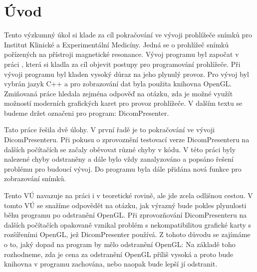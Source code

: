 \chapter{Úvod}
\vspace{-10mm}
Tento výzkumný úkol si klade za cíl pokračování ve vývoji prohlížeče snímků pro Institut Klinické a Experimentální Medicíny. Jedná se o prohlížeč snímků pořízených na přístroji magnetické resonance. Vývoj programu byl započat v práci \cite{neskudla}, která si kladla za cíl objevit postupy pro programování prohlížeče. Při vývoji programu byl kladen vysoký důraz na jeho plynulý provoz. Pro vývoj byl vybrán jazyk C++ a pro zobrazování dat byla použita knihovna OpenGL. Zmiňovaná práce hledala zejména odpověď na otázku, zda je možné využít možností moderních grafických karet pro provoz prohlížeče. V dalším textu se budeme držet označeni pro program: DicomPresenter.

Tato práce řešila dvě úlohy. V první řadě je to pokračování ve vývoji DicomPresenteru. Při pokusu o zprovoznění testovací verze DicomPresenteru na dalších počítačích se začaly oběvovat různé chyby v kódu. V této práci byly nalezené chyby odstraněny a dále bylo vždy zanalyzováno a popsáno řešení problému pro budoucí vývoj. Do programu byla dále přidána nová funkce pro zobrazování snímků.

Tento VÚ navazuje na práci \cite{neskudla} i v teoretické rovině, ale jde zcela odlišnou cestou. V tomto VÚ se snažíme odpovědět na otázku, jak výrazný bude pokles plynulosti běhu programu po odstranění OpenGL. Při zprovozňování DicomPresenteru na dalších počítačích opakovaně vznikal problém s nekompatibilitou grafické karty s rozšířeními OpenGL, jež DicomPresenter používá. Z tohoto důvodu se zajímáme o to, jaký dopad na program by mělo odstranění OpenGL: Na základě toho rozhodneme, zda je cena za odstranění OpenGL příliš vysoká a proto bude knihovna v programu zachována, nebo naopak bude lepší jí odstranit.


